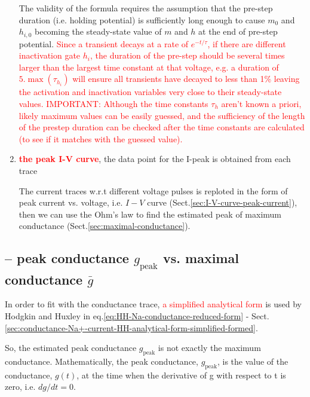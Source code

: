 \begin{enumerate}
The validity of the formula requires the assumption that the pre-step duration
(i.e. holding potential) is sufficiently long enough to cause $m_0$ and
$h_{i,0}$ becoming the steady-state value of $m$ and $h$ at the end of pre-step
potential. \textcolor{red}{Since a transient decays at a rate of $e^{-t/\tau}$,
if there are different inactivation gate $h_i$, the duration of the pre-step
should be several times larger than the largest time constant at that voltage,
e.g. a duration of  $5.\max(\tau_{h_i})$ will ensure all transients
have decayed to less than 1\%
leaving the activation
and inactivation variables very close to their steady-state
values. IMPORTANT: Although the time constants $\tau_h$ aren't known
a priori, likely maximum values can be easily guessed,
and the sufficiency of the length of the prestep duration
can be checked after the time constants are calculated (to see if it matches
with the guessed value).
}


  \item \textcolor{red}{\bf the peak I-V curve}, the data point for the I-peak
  is obtained from each trace

The current traces w.r.t different voltage pulses is reploted in the form
of peak current vs. voltage, i.e. $I-V$ curve
(Sect.\ref{sec:I-V-curve-peak-current}), then we can use the Ohm's law to find
the estimated peak of maximum conductance (Sect.\ref{sec:maximal-conductance}).


\end{enumerate}





\subsection{-- peak conductance $g_\text{peak}$ vs. maximal conductance
$\bar{g}$}
\label{sec:peak-conductance-vs-maximal-conductance}

\def\peak{{\text{peak}}}

In order to fit with the conductance trace, \textcolor{red}{a simplified
analytical form} is used by Hodgkin and Huxley in
eq.\ref{eq:HH-Na-conductance-reduced-form} -
Sect.\ref{sec:conductance-Na+-current-HH-analytical-form-simplified-formed}.

So, the estimated  peak conductance $g_\text{peak}$ is not exactly the maximum
conductance. Mathematically, the peak conductance, $g_\peak$, is the value of
the conductance, $g(t)$, at the time when the derivative of g with respect to t is
zero, i.e. $dg/dt = 0$.

